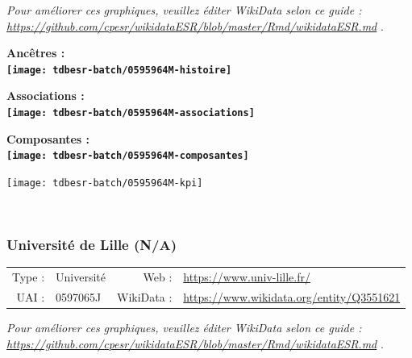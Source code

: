 \documentclass[12pt,french,]{article}
\begin{document}
\textit{\scriptsize Pour améliorer ces graphiques, veuillez éditer WikiData selon ce guide :  \href{https://github.com/cpesr/wikidataESR/blob/master/Rmd/wikidataESR.md}{https://github.com/cpesr/wikidataESR/blob/master/Rmd/wikidataESR.md}}
.

\vspace{1cm}  
\begin{minipage}[b]{0.50\textwidth}\begin{center} \bf Ancêtres : \\  
\texttt{[image: tdbesr-batch/0595964M-histoire]} \end{center}\end{minipage}\begin{minipage}[b]{0.50\textwidth}\begin{center} \bf Associations : \\  
\texttt{[image: tdbesr-batch/0595964M-associations]} \end{center}\end{minipage}

\hrulefill

\begin{center} \bf Composantes : \\  
\texttt{[image: tdbesr-batch/0595964M-composantes]} \end{center}

\begin{center}\texttt{[image: tdbesr-batch/0595964M-kpi]} \end{center}\checkoddpage

\ifoddpage \fi ~\newpage  

\hypertarget{universituxe9-de-lille-na}{%
\subsubsection{Université de Lille
(N/A)}\label{universituxe9-de-lille-na}}

\begin{tabular*}{\textwidth}{rp{5cm}rl}  
\hline  
Type : & Université & Web : &\href{https://www.univ-lille.fr/}{https://www.univ-lille.fr/} \\  
UAI : & 0597065J & WikiData : & \href{https://www.wikidata.org/entity/Q3551621}{https://www.wikidata.org/entity/Q3551621} \\  
\hline  
\end{tabular*}

\textit{\scriptsize Pour améliorer ces graphiques, veuillez éditer WikiData selon ce guide :  \href{https://github.com/cpesr/wikidataESR/blob/master/Rmd/wikidataESR.md}{https://github.com/cpesr/wikidataESR/blob/master/Rmd/wikidataESR.md}}
.
\end{document}

